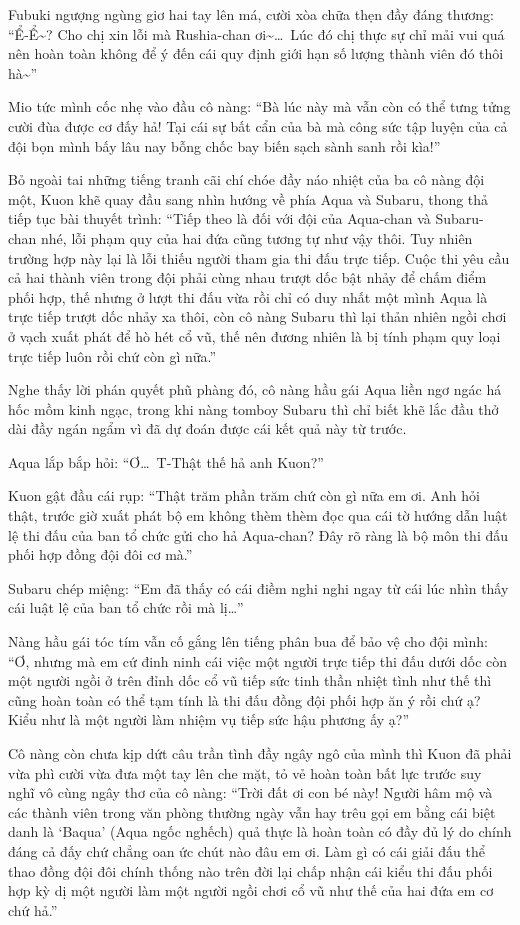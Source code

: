 \documentclass[../main.tex]{subfiles}
\begin{document}
Fubuki ngượng ngùng giơ hai tay lên má, cười xòa chữa thẹn đầy đáng thương: ``Ể-Ể\~{}? Cho chị xin lỗi mà Rushia-chan ơi\~{}\dots\ Lúc đó chị thực sự chỉ mải vui quá nên hoàn toàn không để ý đến cái quy định giới hạn số lượng thành viên đó thôi hà\~{}''

Mio tức mình cốc nhẹ vào đầu cô nàng: ``Bà lúc này mà vẫn còn có thể tưng tửng cười đùa được cơ đấy hả! Tại cái sự bất cẩn của bà mà công sức tập luyện của cả đội bọn mình bấy lâu nay bỗng chốc bay biến sạch sành sanh rồi kìa!''

Bỏ ngoài tai những tiếng tranh cãi chí chóe đầy náo nhiệt của ba cô nàng đội một, Kuon khẽ quay đầu sang nhìn hướng về phía Aqua và Subaru, thong thả tiếp tục bài thuyết trình: ``Tiếp theo là đối với đội của Aqua-chan và Subaru-chan nhé, lỗi phạm quy của hai đứa cũng tương tự như vậy thôi. Tuy nhiên trường hợp này lại là lỗi thiếu người tham gia thi đấu trực tiếp. Cuộc thi yêu cầu cả hai thành viên trong đội phải cùng nhau trượt dốc bật nhảy để chấm điểm phối hợp, thế nhưng ở lượt thi đấu vừa rồi chỉ có duy nhất một mình Aqua là trực tiếp trượt dốc nhảy xa thôi, còn cô nàng Subaru thì lại thản nhiên ngồi chơi ở vạch xuất phát để hò hét cổ vũ, thế nên đương nhiên là bị tính phạm quy loại trực tiếp luôn rồi chứ còn gì nữa.''

Nghe thấy lời phán quyết phũ phàng đó, cô nàng hầu gái Aqua liền ngơ ngác há hốc mồm kinh ngạc, trong khi nàng tomboy Subaru thì chỉ biết khẽ lắc đầu thở dài đầy ngán ngẩm vì đã dự đoán được cái kết quả này từ trước.

Aqua lắp bắp hỏi: ``Ơ\dots\ T-Thật thế hả anh Kuon?''

Kuon gật đầu cái rụp: ``Thật trăm phần trăm chứ còn gì nữa em ơi. Anh hỏi thật, trước giờ xuất phát bộ em không thèm thèm đọc qua cái tờ hướng dẫn luật lệ thi đấu của ban tổ chức gửi cho hả Aqua-chan? Đây rõ ràng là bộ môn thi đấu phối hợp đồng đội đôi cơ mà.''

Subaru chép miệng: ``Em đã thấy có cái điềm nghi nghi ngay từ cái lúc nhìn thấy cái luật lệ của ban tổ chức rồi mà lị\dots''

Nàng hầu gái tóc tím vẫn cố gắng lên tiếng phân bua để bảo vệ cho đội mình: ``Ơ, nhưng mà em cứ đinh ninh cái việc một người trực tiếp thi đấu dưới dốc còn một người ngồi ở trên đỉnh dốc cổ vũ tiếp sức tinh thần nhiệt tình như thế thì cũng hoàn toàn có thể tạm tính là thi đấu đồng đội phối hợp ăn ý rồi chứ ạ? Kiểu như là một người làm nhiệm vụ tiếp sức hậu phương ấy ạ?''

Cô nàng còn chưa kịp dứt câu trần tình đầy ngây ngô của mình thì Kuon đã phải vừa phì cười vừa đưa một tay lên che mặt, tỏ vẻ hoàn toàn bất lực trước suy nghĩ vô cùng ngây thơ của cô nàng: ``Trời đất ơi con bé này! Người hâm mộ và các thành viên trong văn phòng thường ngày vẫn hay trêu gọi em bằng cái biệt danh là `Baqua' (Aqua ngốc nghếch) quả thực là hoàn toàn có đầy đủ lý do chính đáng cả đấy chứ chẳng oan ức chút nào đâu em ơi. Làm gì có cái giải đấu thể thao đồng đội đôi chính thống nào trên đời lại chấp nhận cái kiểu thi đấu phối hợp kỳ dị một người làm một người ngồi chơi cổ vũ như thế của hai đứa em cơ chứ hả.''
\end{document}
